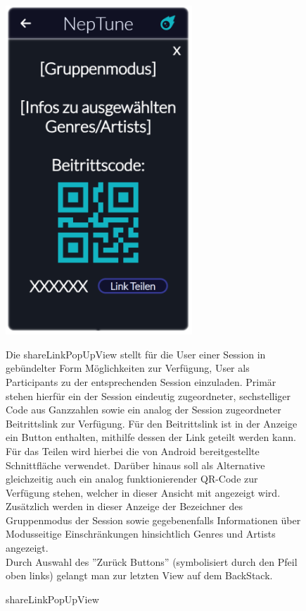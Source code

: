 \documentclass[oneside, ngerman]{sdqtechreport}
\begin{document}
\begin{figure}
    \hypertarget{shareLinkPopUpView}{}
    \begin{minipage}[t]{7 cm}
        \vspace{-1.5ex}
        \includegraphics[width=7cm]{LATEX/Pflichtenheft/GraphicDesigns/shareLinkPopUpPage.png}
        \caption{shareLinkPopUpView}
    \end{minipage}
    \hspace{1cm}
    \begin{minipage}[t]{7 cm}
        \vspace{1cm}
        Die shareLinkPopUpView stellt für die User einer Session in gebündelter Form Möglichkeiten zur Verfügung, User als Participants zu der entsprechenden Session einzuladen. Primär stehen hierfür ein der Session eindeutig zugeordneter, sechstelliger Code aus Ganzzahlen sowie ein analog der Session zugeordneter Beitrittslink zur Verfügung. Für den Beitrittslink ist in der Anzeige ein Button enthalten, mithilfe dessen der Link geteilt werden kann. Für das Teilen wird hierbei die von Android bereitgestellte Schnittfläche verwendet. Darüber hinaus soll als Alternative gleichzeitig auch ein analog funktionierender QR-Code zur Verfügung stehen, welcher in dieser Ansicht mit angezeigt wird. Zusätzlich werden in dieser Anzeige der Bezeichner des Gruppenmodus der Session sowie gegebenenfalls Informationen über Modusseitige Einschränkungen hinsichtlich Genres und Artists angezeigt.\\
        Durch Auswahl des ''Zurück Buttons'' (symbolisiert durch den Pfeil oben links) gelangt man zur letzten View auf dem BackStack.
 \end{minipage}
\end{figure}
\end{document}
